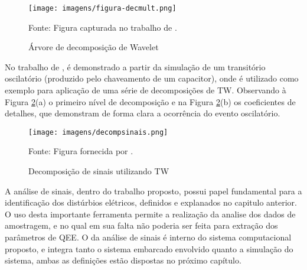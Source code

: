\begin{figure}[!h]
\begin{center}
\caption{Árvore de decomposição de Wavelet}
\texttt{[image: imagens/figura-decmult.png]}
\par{\small Fonte: Figura capturada no trabalho de \cite{MEN08}.}
\label{fig:decomp}
\end{center}
\end{figure}
\par
No trabalho de \cite{BAC11}, é demonstrado a partir da simulação de um transitório oscilatório (produzido pelo chaveamento de um capacitor), onde é utilizado como exemplo para aplicação de uma série de decomposições de TW. Observando à Figura \ref{fig:decomptw}(a) o primeiro nível de decomposição e na Figura \ref{fig:decomptw}(b) os coeficientes de detalhes, que demonstram de forma clara a ocorrência do evento oscilatório.
\begin{figure}[!h]
\begin{center}
\caption{Decomposição de sinais utilizando TW}
\texttt{[image: imagens/decompsinais.png]}
\par{\small Fonte: Figura fornecida por \cite{BAC11}.}
\label{fig:decomptw}
\end{center}
\end{figure}
\par
A análise de sinais, dentro do trabalho proposto, possui papel fundamental para a identificação dos distúrbios elétricos, definidos e explanados no capitulo anterior. O uso desta importante ferramenta permite a realização da analise dos dados de amostragem, e no qual em sua falta não poderia ser feita para extração dos parâmetros de QEE. O da análise de sinais é interno do sistema computacional proposto, e integra tanto o sistema embarcado envolvido quanto a simulação do sistema, ambas as definições estão dispostas no próximo capítulo.
